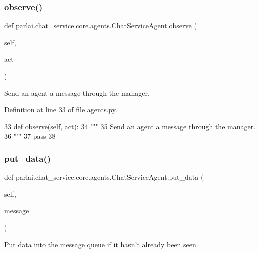 \subsubsection{\texorpdfstring{observe()}{observe()}}
{\footnotesize\ttfamily def parlai.\+chat\+\_\+service.\+core.\+agents.\+Chat\+Service\+Agent.\+observe (\begin{DoxyParamCaption}\item[{}]{self,  }\item[{}]{act }\end{DoxyParamCaption})}

\begin{DoxyVerb}Send an agent a message through the manager.
\end{DoxyVerb}
 

Definition at line 33 of file agents.\+py.


\begin{DoxyCode}
33     \textcolor{keyword}{def }observe(self, act):
34         \textcolor{stringliteral}{"""}
35 \textcolor{stringliteral}{        Send an agent a message through the manager.}
36 \textcolor{stringliteral}{        """}
37         \textcolor{keywordflow}{pass}
38 
\end{DoxyCode}
\mbox{\label{classparlai_1_1chat__service_1_1core_1_1agents_1_1ChatServiceAgent_a7a066db782ac2ebd1e2f704354c9f348}} 
\subsubsection{\texorpdfstring{put\+\_\+data()}{put\_data()}}
{\footnotesize\ttfamily def parlai.\+chat\+\_\+service.\+core.\+agents.\+Chat\+Service\+Agent.\+put\+\_\+data (\begin{DoxyParamCaption}\item[{}]{self,  }\item[{}]{message }\end{DoxyParamCaption})}

\begin{DoxyVerb}Put data into the message queue if it hasn't already been seen.
\end{DoxyVerb}
 

